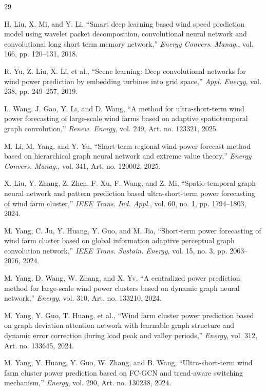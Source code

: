 \begin{thebibliography}{29}

H. Liu, X. Mi, and Y. Li, ``Smart deep learning based wind speed prediction model using wavelet packet decomposition, convolutional neural network and convolutional long short term memory network,'' \textit{Energy Convers. Manag.}, vol. 166, pp. 120--131, 2018.

R. Yu, Z. Liu, X. Li, et al., ``Scene learning: Deep convolutional networks for wind power prediction by embedding turbines into grid space,'' \textit{Appl. Energy}, vol. 238, pp. 249--257, 2019.

L. Wang, J. Gao, Y. Li, and D. Wang, ``A method for ultra-short-term wind power forecasting of large-scale wind farms based on adaptive spatiotemporal graph convolution,'' \textit{Renew. Energy}, vol. 249, Art. no. 123321, 2025.

M. Li, M. Yang, and Y. Yu, ``Short-term regional wind power forecast method based on hierarchical graph neural network and extreme value theory,'' \textit{Energy Convers. Manag.}, vol. 341, Art. no. 120002, 2025.

X. Liu, Y. Zhang, Z. Zhen, F. Xu, F. Wang, and Z. Mi, ``Spatio-temporal graph neural network and pattern prediction based ultra-short-term power forecasting of wind farm cluster,'' \textit{IEEE Trans. Ind. Appl.}, vol. 60, no. 1, pp. 1794--1803, 2024.

M. Yang, C. Ju, Y. Huang, Y. Guo, and M. Jia, ``Short-term power forecasting of wind farm cluster based on global information adaptive perceptual graph convolution network,'' \textit{IEEE Trans. Sustain. Energy}, vol. 15, no. 3, pp. 2063--2076, 2024.

M. Yang, D. Wang, W. Zhang, and X. Yv, ``A centralized power prediction method for large-scale wind power clusters based on dynamic graph neural network,'' \textit{Energy}, vol. 310, Art. no. 133210, 2024.

M. Yang, Y. Guo, T. Huang, et al., ``Wind farm cluster power prediction based on graph deviation attention network with learnable graph structure and dynamic error correction during load peak and valley periods,'' \textit{Energy}, vol. 312, Art. no. 133645, 2024.

M. Yang, Y. Huang, Y. Guo, W. Zhang, and B. Wang, ``Ultra-short-term wind farm cluster power prediction based on FC-GCN and trend-aware switching mechanism,'' \textit{Energy}, vol. 290, Art. no. 130238, 2024.


\end{thebibliography}
